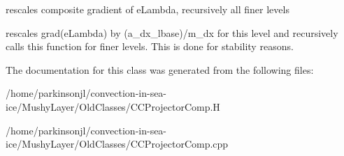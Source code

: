 rescales composite gradient of e\-Lambda, recursively all finer levels 

rescales grad(e\-Lambda) by (a\-\_\-dx\-\_\-lbase)/m\-\_\-dx for this level and recursively calls this function for finer levels. This is done for stability reasons. 

The documentation for this class was generated from the following files\-:\begin{DoxyCompactItemize}
\item 
/home/parkinsonjl/convection-\/in-\/sea-\/ice/\-Mushy\-Layer/\-Old\-Classes/C\-C\-Projector\-Comp.\-H\item 
/home/parkinsonjl/convection-\/in-\/sea-\/ice/\-Mushy\-Layer/\-Old\-Classes/C\-C\-Projector\-Comp.\-cpp\end{DoxyCompactItemize}
